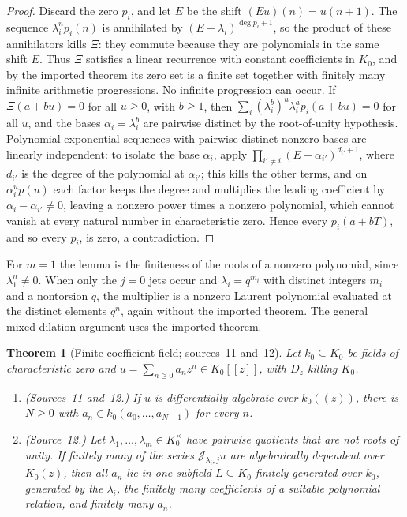 \documentclass[11pt]{article}
\numberwithin{equation}{section}
\newtheorem{theorem}{Theorem}[section]
\theoremstyle{definition}
\theoremstyle{remark}
\newcommand{\jet}[2]{\mathcal J_{#1,#2}}
\begin{document}
\begin{proof}
Discard the zero $p_i$, and let $E$ be the shift $(Eu)(n)=u(n+1)$. The
sequence $\lambda_i^np_i(n)$ is annihilated by $(E-\lambda_i)^{\deg p_i+1}$, so
the product of these annihilators kills $\Xi$: they commute because they
are polynomials in the same shift $E$. Thus $\Xi$ satisfies a linear
recurrence with constant coefficients in $K_0$, and
by the imported theorem its zero set is a finite set together with finitely
many infinite arithmetic progressions. No infinite progression can occur.
If $\Xi(a+bu)=0$ for all $u\ge0$, with $b\ge1$, then
$\sum_i(\lambda_i^b)^u\lambda_i^ap_i(a+bu)=0$ for all $u$, and the bases
$\alpha_i=\lambda_i^b$ are pairwise distinct by the root-of-unity hypothesis.
Polynomial-exponential sequences with pairwise distinct nonzero bases are
linearly independent: to isolate the base $\alpha_i$, apply
$\prod_{i'\ne i}(E-\alpha_{i'})^{d_{i'}+1}$, where $d_{i'}$ is the degree of the
polynomial at $\alpha_{i'}$; this kills the other terms, and on
$\alpha_i^up(u)$ each factor keeps the degree and multiplies the leading
coefficient by $\alpha_i-\alpha_{i'}\ne0$, leaving a nonzero power times a
nonzero polynomial, which cannot vanish at every natural number in
characteristic zero. Hence every $p_i(a+bT)$, and so every $p_i$, is zero, a
contradiction.
\end{proof}

For $m=1$ the lemma is the finiteness of the roots of a nonzero polynomial,
since $\lambda_1^n\ne0$. When only the $j=0$ jets occur and
$\lambda_i=q^{m_i}$ with distinct integers $m_i$ and a nontorsion $q$, the
multiplier is a nonzero Laurent polynomial evaluated at the distinct elements
$q^n$, again without the imported theorem. The general mixed-dilation
argument uses the imported theorem.

\begin{theorem}[Finite coefficient field; sources~11 and~12]
\label{hol:cf:thm:coefficients}
Let $k_0\subseteq K_0$ be fields of characteristic zero and
$u=\sum_{n\ge0}a_nz^n\in K_0[[z]]$, with $D_z$ killing $K_0$.
\begin{enumerate}[label=\textup{(\alph*)}]
\item \textup{(Sources~11 and~12.)} If $u$ is differentially algebraic over
$k_0((z))$, there is $N\ge0$ with $a_n\in k_0(a_0,\ldots,a_{N-1})$ for every
$n$.
\item \textup{(Source~12.)} Let $\lambda_1,\ldots,\lambda_m\in K_0^\times$
have pairwise quotients that are not roots of unity. If finitely many of the
series $\jet{\lambda_i}ju$ are algebraically dependent over $K_0(z)$, then all
$a_n$ lie in one subfield $L\subseteq K_0$ finitely generated over $k_0$,
generated by the $\lambda_i$, the finitely many coefficients of a suitable
polynomial relation, and finitely many $a_n$.
\end{enumerate}
\end{theorem}
\end{document}
